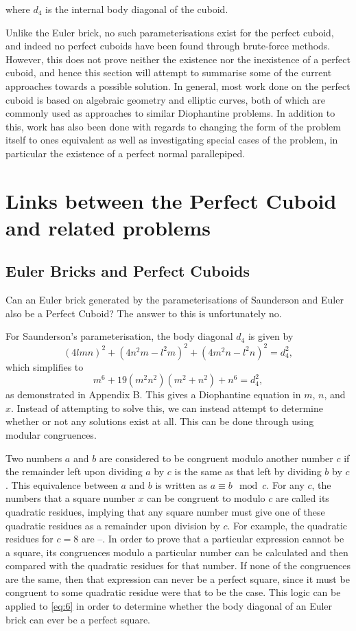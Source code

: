 \documentclass[11pt]{article}
\begin{document}
where $d_4$ is the internal body diagonal of the cuboid. 

Unlike the Euler brick, no such parameterisations exist for the perfect cuboid, and indeed no perfect cuboids have been found through brute-force methods. However, this does not prove neither the existence nor the inexistence of a perfect cuboid, and hence this section will attempt to summarise some of the current approaches towards a possible solution. In general, most work done on the perfect cuboid is based on algebraic geometry and elliptic curves, both of which are commonly used as approaches to similar Diophantine problems. In addition to this, work has also been done with regards to changing the form of the problem itself to ones equivalent as well as investigating special cases of the problem, in particular the existence of a perfect normal parallepiped.

\section{Links between the Perfect Cuboid and related problems}

\subsection{Euler Bricks and Perfect Cuboids}
Can an Euler brick generated by the parameterisations of Saunderson and Euler also be a Perfect Cuboid? The answer to this is unfortunately no.

For Saunderson's parameterisation, the body diagonal $d_4$ is given by
$$(4lmn)^2+(4n^2m-l^2m)^2+(4m^2n-l^2n)^2=d_4^2,$$
which simplifies to
\begin{equation}
m^6+19(m^2n^2)(m^2+n^2)+n^6=d_4^2,
\end{equation}
as demonstrated in Appendix B. This gives a Diophantine equation in $m$, $n$, and $x$. Instead of attempting to solve this, we can instead attempt to determine whether or not any solutions exist at all. This can be done through using modular congruences.

Two numbers $a$ and $b$ are considered to be congruent modulo another number $c$ if the remainder left upon dividing $a$ by $c$ is the same as that left by dividing $b$ by $c$. This equivalence between $a$ and $b$ is written as $a\equiv{b}\mod{c}$. For any $c$, the numbers that a square number $x$ can be congruent to modulo $c$ are called its quadratic residues, implying that any square number must give one of these quadratic residues as a remainder upon division by $c$. For example, the quadratic residues for $c=8$ are --. In order to prove that a particular expression cannot be a square, its congruences modulo a particular number can be calculated and then compared with the quadratic residues for that number. If none of the congruences are the same, then that expression can never be a perfect square, since it must be congruent to some quadratic residue were that to be the case. This logic can be applied to \eqref{eq:6} in order to determine whether the body diagonal of an Euler brick can ever be a perfect square. 
\end{document}
